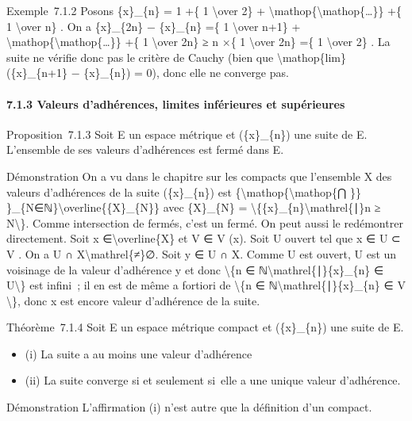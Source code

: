 \documentclass[]{article}
\begin{document}
Exemple~7.1.2 Posons \{x\}\_\{n\} = 1 +\{ 1 \textbackslash{}over 2\} +
\textbackslash{}mathop\{\textbackslash{}mathop\{\ldots{}\}\} +\{ 1
\textbackslash{}over n\} . On a \{x\}\_\{2n\} − \{x\}\_\{n\} =\{ 1
\textbackslash{}over n+1\} +
\textbackslash{}mathop\{\textbackslash{}mathop\{\ldots{}\}\} +\{ 1
\textbackslash{}over 2n\} ≥ n ×\{ 1 \textbackslash{}over 2n\} =\{ 1
\textbackslash{}over 2\} . La suite ne vérifie donc pas le critère de
Cauchy (bien que \textbackslash{}mathop\{lim\}(\{x\}\_\{n+1\} −
\{x\}\_\{n\}) = 0), donc elle ne converge pas.

\paragraph{7.1.3 Valeurs d'adhérences, limites inférieures et
supérieures}

Proposition~7.1.3 Soit E un espace métrique et (\{x\}\_\{n\}) une suite
de E. L'ensemble de ses valeurs d'adhérences est fermé dans E.

Démonstration On a vu dans le chapitre sur les compacts que l'ensemble X
des valeurs d'adhérences de la suite (\{x\}\_\{n\}) est
\{\textbackslash{}mathop\{\textbackslash{}mathop\{⋂ \}\}
\}\_\{N∈ℕ\}\textbackslash{}overline\{\{X\}\_\{N\}\} avec \{X\}\_\{N\} =
\textbackslash{}\{\{x\}\_\{n\}\textbackslash{}mathrel\{∣\}n ≥
N\textbackslash{}\}. Comme intersection de fermés, c'est un fermé. On
peut aussi le redémontrer directement. Soit x
∈\textbackslash{}overline\{X\} et V ∈ V (x). Soit U ouvert tel que x ∈ U
⊂ V . On a U ∩ X\textbackslash{}mathrel\{≠\}∅. Soit y ∈ U ∩ X. Comme U
est ouvert, U est un voisinage de la valeur d'adhérence y et donc
\textbackslash{}\{n ∈ ℕ\textbackslash{}mathrel\{∣\}\{x\}\_\{n\} ∈
U\textbackslash{}\} est infini~; il en est de même a fortiori de
\textbackslash{}\{n ∈ ℕ\textbackslash{}mathrel\{∣\}\{x\}\_\{n\} ∈ V
\textbackslash{}\}, donc x est encore valeur d'adhérence de la suite.

Théorème~7.1.4 Soit E un espace métrique compact et (\{x\}\_\{n\}) une
suite de E.

\begin{itemize}
\itemsep1pt\parskip0pt
\item
  (i) La suite a au moins une valeur d'adhérence
\item
  (ii) La suite converge si et seulement si~elle a une unique valeur
  d'adhérence.
\end{itemize}

Démonstration L'affirmation (i) n'est autre que la définition d'un
compact.
\end{document}
